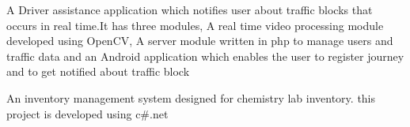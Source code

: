\documentclass[11pt]{hieudo-build}
\begin{document}
\begin{minipage}[t]{0.63\textwidth}
\descript{}
\par \noindent
A Driver assistance  application which notifies user about traffic blocks that occurs  in  real time.It has three modules,  A real time video processing module developed using OpenCV, A server module written in php to manage users and traffic data and an Android application which enables the user to register journey and to get notified about traffic block 

\sectionsep 

\descript{}
An inventory management system designed for chemistry lab inventory. this project is developed using c\#.net 
\sectionsep

\end{minipage} 
\end{document}
